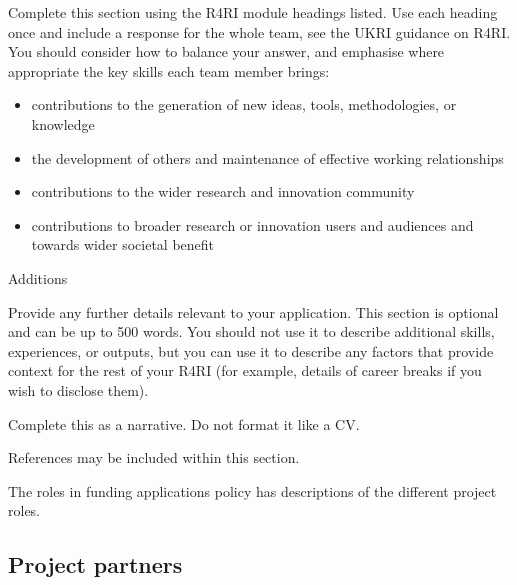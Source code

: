 \documentclass[12pt]{article}
\newenvironment{instruction}{\par\color{red}}{\par}
\begin{document}
\begin{instruction}
Complete this section using the R4RI module headings listed. Use each
heading once and include a response for the whole team, see the UKRI
guidance on R4RI. You should consider how to balance your answer, and
emphasise where appropriate the key skills each team member brings:

\begin{itemize}

    \item contributions to the generation of new ideas, tools, methodologies, or
knowledge

    \item the development of others and maintenance of effective working relationships

    \item contributions to the wider research and innovation community

    \item contributions to broader research or innovation users and audiences and
towards wider societal benefit

\end{itemize}

Additions

Provide any further details relevant to your application. This section is
optional and can be up to 500 words. You should not use it to describe
additional skills, experiences, or outputs, but you can use it to describe any
factors that provide context for the rest of your R4RI (for example, details of
career breaks if you wish to disclose them).

Complete this as a narrative. Do not format it like a CV.

References may be included within this section.

The roles in funding applications policy has descriptions of the different
project roles.

\end{instruction}

% 

\pagebreak
\subsection{Project partners}
\end{document}

